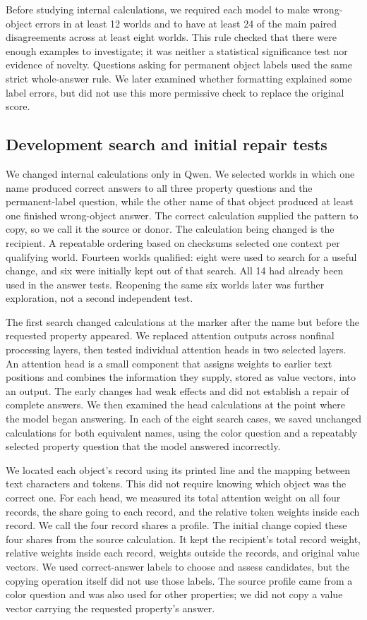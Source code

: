 \documentclass[10pt,letterpaper]{article}
\begin{document}
Before studying internal calculations, we required each model to make wrong-object errors in at least 12 worlds and to have at least 24 of the main paired disagreements across at least eight worlds. This rule checked that there were enough examples to investigate; it was neither a statistical significance test nor evidence of novelty. Questions asking for permanent object labels used the same strict whole-answer rule. We later examined whether formatting explained some label errors, but did not use this more permissive check to replace the original score.


\subsection*{Development search and initial repair tests}

We changed internal calculations only in Qwen. We selected worlds in which one name produced correct answers to all three property questions and the permanent-label question, while the other name of that object produced at least one finished wrong-object answer. The correct calculation supplied the pattern to copy, so we call it the source or donor. The calculation being changed is the recipient. A repeatable ordering based on checksums selected one context per qualifying world. Fourteen worlds qualified: eight were used to search for a useful change, and six were initially kept out of that search. All 14 had already been used in the answer tests. Reopening the same six worlds later was further exploration, not a second independent test.


The first search changed calculations at the marker after the name but before the requested property appeared. We replaced attention outputs across nonfinal processing layers, then tested individual attention heads in two selected layers. An attention head is a small component that assigns weights to earlier text positions and combines the information they supply, stored as value vectors, into an output. The early changes had weak effects and did not establish a repair of complete answers. We then examined the head calculations at the point where the model began answering. In each of the eight search cases, we saved unchanged calculations for both equivalent names, using the color question and a repeatably selected property question that the model answered incorrectly.


We located each object's record using its printed line and the mapping between text characters and tokens. This did not require knowing which object was the correct one. For each head, we measured its total attention weight on all four records, the share going to each record, and the relative token weights inside each record. We call the four record shares a profile. The initial change copied these four shares from the source calculation. It kept the recipient's total record weight, relative weights inside each record, weights outside the records, and original value vectors. We used correct-answer labels to choose and assess candidates, but the copying operation itself did not use those labels. The source profile came from a color question and was also used for other properties; we did not copy a value vector carrying the requested property's answer.
\end{document}
